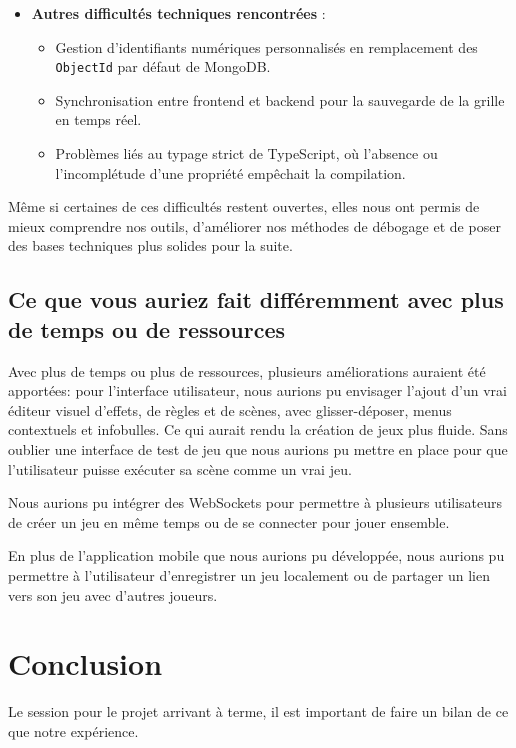 \documentclass[12pt]{article}        %
\begin{document}
\begin{itemize}
  \item \textbf{Autres difficultés techniques rencontrées} :
  \begin{itemize}
    \item Gestion d’identifiants numériques personnalisés en remplacement des \texttt{ObjectId} par défaut de MongoDB.
    \item Synchronisation entre frontend et backend pour la sauvegarde de la grille en temps réel.
    \item Problèmes liés au typage strict de TypeScript, où l’absence ou l’incomplétude d’une propriété empêchait la compilation.
  \end{itemize}
\end{itemize}

\noindent Même si certaines de ces difficultés restent ouvertes, elles nous ont permis de mieux comprendre nos outils, d’améliorer nos méthodes de débogage et de poser des bases techniques plus solides pour la suite.


\subsection{Ce que vous auriez fait différemment avec plus de temps ou 
de ressources}
\label{subsec:avec du temps}
Avec plus de temps ou plus de ressources, plusieurs améliorations 
auraient été apportées: pour l'interface utilisateur, nous aurions pu
envisager l'ajout d’un vrai éditeur visuel d’effets, de règles et de 
scènes, avec glisser-déposer, menus contextuels et infobulles. Ce qui 
aurait rendu la création de jeux plus fluide. Sans oublier une
interface de test de jeu que nous aurions pu mettre en place pour que
l'utilisateur puisse exécuter sa scène comme un vrai jeu.

Nous aurions pu intégrer des WebSockets pour permettre à plusieurs 
utilisateurs de créer un jeu en même temps ou de se connecter pour jouer 
ensemble.

En plus de l'application mobile que nous aurions pu développée, nous 
aurions pu permettre à l’utilisateur d’enregistrer un jeu localement ou 
de partager un lien vers son jeu avec d’autres joueurs.

\section{Conclusion}
\label{sec:Conclusion}
Le session pour le projet arrivant à terme, il est important de faire un
bilan de ce que notre expérience.
\end{document}
